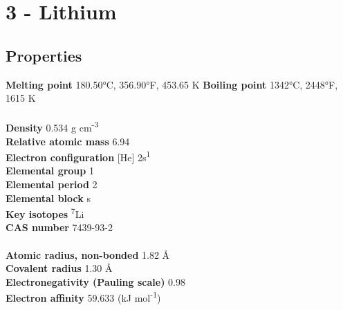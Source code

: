 \section{3 - Lithium}
\label{sec:elem-lithium}
\subsection{Properties}
\textbf{Melting point} 180.50°C, 356.90°F, 453.65 K
\textbf{Boiling point} 1342°C, 2448°F, 1615 K\\
\\
\textbf{Density} 0.534 g cm\textsuperscript{-3}\\
\textbf{Relative atomic mass} 6.94\\
\textbf{Electron configuration} [He] 2s\textsuperscript{1}\\
\textbf{Elemental group} 1\\
\textbf{Elemental period} 2\\
\textbf{Elemental block} s\\
\textbf{Key isotopes} \textsuperscript{7}Li\\
\textbf{CAS number} 7439-93-2\\
\\
\textbf{Atomic radius, non-bonded} 1.82 Å\\
\textbf{Covalent radius} 1.30 Å\\
\textbf{Electronegativity (Pauling scale)} 0.98\\
\textbf{Electron affinity} 59.633 (kJ mol\textsuperscript{-1})\\